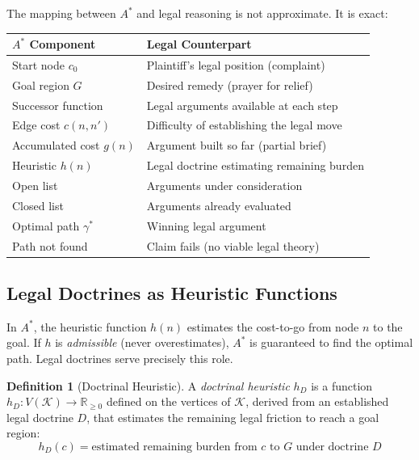 \documentclass[12pt]{article}
\theoremstyle{definition}
\newtheorem{definition}[theorem]{Definition}
\theoremstyle{remark}
\newcommand{\R}{\mathbb{R}}
\begin{document}
The mapping between $A^*$ and legal reasoning is not approximate.  It is exact:

\begin{center}
\begin{tabular}{ll}
\toprule
\textbf{$A^*$ Component} & \textbf{Legal Counterpart} \\
\midrule
Start node $c_0$ & Plaintiff's legal position (complaint) \\
Goal region $G$ & Desired remedy (prayer for relief) \\
Successor function & Legal arguments available at each step \\
Edge cost $c(n, n')$ & Difficulty of establishing the legal move \\
Accumulated cost $g(n)$ & Argument built so far (partial brief) \\
Heuristic $h(n)$ & Legal doctrine estimating remaining burden \\
Open list & Arguments under consideration \\
Closed list & Arguments already evaluated \\
Optimal path $\gamma^*$ & Winning legal argument \\
Path not found & Claim fails (no viable legal theory) \\
\bottomrule
\end{tabular}
\end{center}

\subsection{Legal Doctrines as Heuristic Functions}

In $A^*$, the heuristic function $h(n)$ estimates the cost-to-go from node $n$ to the goal.  If $h$ is \emph{admissible} (never overestimates), $A^*$ is guaranteed to find the optimal path.  Legal doctrines serve precisely this role.

\begin{definition}[Doctrinal Heuristic]
A \emph{doctrinal heuristic} $h_D$ is a function $h_D: V(\mathcal{K}) \to \R_{\geq 0}$ defined on the vertices of $\mathcal{K}$, derived from an established legal doctrine $D$, that estimates the remaining legal friction to reach a goal region:
\begin{equation}
h_D(c) = \text{estimated remaining burden from } c \text{ to } G \text{ under doctrine } D
\label{eq:doctrinal_heuristic}
\end{equation}
\end{definition}
\end{document}
